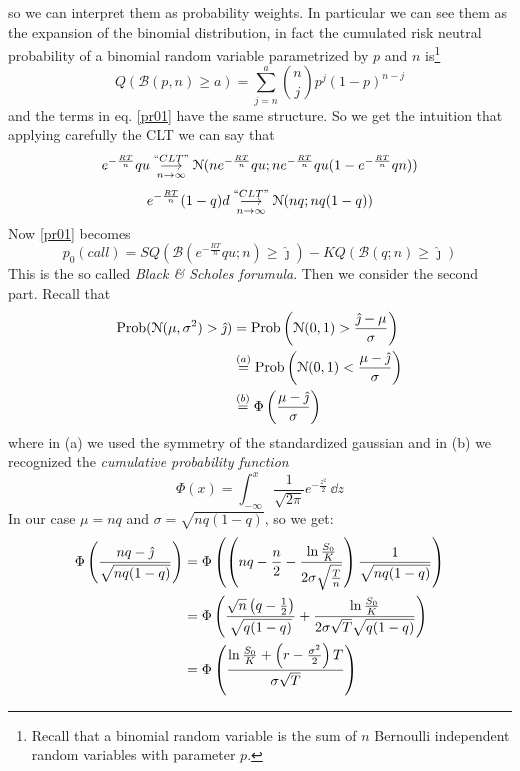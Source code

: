 so we can interpret them as probability weights. In particular we can see them as the expansion of the binomial distribution, in fact the cumulated risk neutral probability of a binomial random variable parametrized by $p$ and $n$ is\footnote{Recall that a binomial random variable is the sum of $n$ Bernoulli independent random variables with parameter $p$.}
\begin{equation}
    Q(\mathcal{B}(p,n)\ge a) = \sum_{j=n}^a\binom{n}{j}p^j(1-p)^{n-j}
\end{equation}
and the terms in eq. \eqref{pr01} have the same structure. So we get the intuition that applying carefully the CLT we can say that
\begin{equation}
    e^{-\frac{RT}{n}}qu \overset{``CLT"}{\underset{n\to\infty}{\longrightarrow}}\mathcal{N}(ne^{-\frac{RT}{n}}qu;ne^{-\frac{RT}{n}}qu(1-e^{-\frac{RT}{n}}qn))
\end{equation}
\begin{equation}
    e^{-\frac{RT}{n}}(1-q)d \overset{``CLT"}{\underset{n\to\infty}{\longrightarrow}} \mathcal{N}(nq;nq(1-q))
\end{equation}
Now \eqref{pr01} becomes
\begin{equation}\label{pr02}
    p_0(call) = SQ(\mathcal{B}(e^{-\frac{RT}{n}}qu;n)\ge\hat{\jmath})-KQ(\mathcal{B}(q;n)\ge\hat{\jmath})
\end{equation}
This is the so called \emph{Black \& Scholes forumula}. Then we consider the second part. Recall that
\begin{align}
    \notag \operatorname{Prob}(\mathcal{N}(\mu,\sigma^2)>\hat{\jmath})
    &=
    \operatorname{Prob}\left(\mathcal{N}(0,1)>\dfrac{\hat{\jmath}-\mu}{\sigma}\right) \\
    &\overset{(a)}{=} \notag \operatorname{Prob}\left(\mathcal{N}(0,1)<\dfrac{\mu-\hat{\jmath}}{\sigma}\right) \\
    &\overset{(b)}{=} \Phi\left(\dfrac{\mu-\hat{\jmath}}{\sigma}\right)
\end{align}
where in (a) we used the symmetry of the standardized gaussian and in (b) we recognized the \emph{cumulative probability function}
\begin{equation}
\Phi(x)=\int^{x}_{-\infty}\frac{1}{\sqrt{2\pi}}e^{-\frac{z^2}{2}}\,\dd z
\end{equation}
In our case $\mu=nq$ and $\sigma=\sqrt{nq(1-q)}$, so we get:
\begin{align}
    \notag\Phi\left(\dfrac{nq-\hat{\jmath}}{\sqrt{nq(1-q)}}\right)
    &= \Phi\left(\left(nq-\dfrac{n}{2}-\dfrac{\ln\frac{S_0}{K}}{2\sigma\sqrt{\frac{T}{n}}}\right)\dfrac{1}{\sqrt{nq(1-q)}}\right) \\
    &=
    \notag\Phi\left(
    \dfrac{\sqrt{n}\left(q-\frac{1}{2}\right)}{\sqrt{q(1-q)}} + \dfrac{\ln\frac{S_0}{K}}{2\sigma\sqrt{T}\sqrt{q(1-q)}}
    \right)\\
    &=
    \Phi\left(
    \dfrac{\ln\frac{S_0}{K}+\left(r-\frac{\sigma^2}{2}\right)T}{\sigma\sqrt{T}}
    \right)
\end{align}
